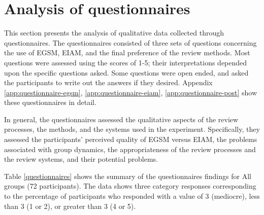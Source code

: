 \section {Analysis of questionnaires}
\label{sec:questionnaires}
This section presents the analysis of qualitative data collected
through questionnaires. The 
questionnaires consisted of three sets of questions concerning the use
of EGSM, EIAM, and the final preference of the review methods.
Most questions were assessed using the scores of 1-5; their
interpretations depended upon the specific questions asked.
Some questions were open ended, and asked the participants to write out
the answers if they desired.
Appendix \ref{app:questionnaire-egsm}, \ref{app:questionnaire-eiam},
\ref{app:questionnaire-post} show these questionnaires in detail.

In general, the questionnaires assessed the qualitative aspects
of the review processes, the methods, and the systems used in the
experiment. Specifically, they assessed the participants'
perceived quality of EGSM versus EIAM, the problems associated with group
dynamics,  the appropriateness of the review processes and the
review systems, and their potential problems. 

Table \ref{questionnaires} shows the summary of the questionnaires
findings for All groups (72 participants). The data shows three
category responses corresponding to the percentage of participants
who responded with a value of 3 (mediocre), less than 3 (1 or 2),  or 
greater than 3 (4 or 5). 


